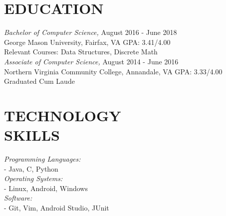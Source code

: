 \documentclass[margin, 10pt]{res} %
\begin{document}
\begin{resume}



\section{EDUCATION}

{\sl Bachelor of Computer Science,}  \hfill August 2016 - June 2018 \\
George Mason University, Fairfax, VA \hfill GPA: 3.41/4.00 \smallskip\\
Relevant Courses: Data Structures, Discrete Math\\

{\sl Associate of Computer Science,}  \hfill August 2014 - June 2016 \\
Northern Virginia Community College, Annandale, VA \hfill GPA: 3.33/4.00 \smallskip\\
Graduated Cum Laude\\
 

\section{TECHNOLOGY \\ SKILLS} 

{\sl Programming Languages:} \\ \null\qquad - Java, C, Python \\
{\sl Operating Systems:} \\ \null\qquad - Linux, Android, Windows \\
{\sl Software:} \\ \null\qquad - Git, Vim, Android Studio, JUnit \\
 
 

\end{resume}
\end{document}
